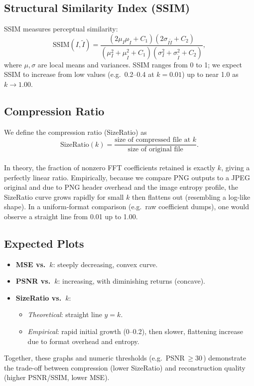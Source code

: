 \documentclass[12pt]{article}
\begin{document}
\subsection{Structural Similarity Index (SSIM)}
SSIM measures perceptual similarity:
\[
\mathrm{SSIM}(I,\tilde I)
=\frac{(2\mu_I\mu_{\tilde I}+C_1)(2\sigma_{I\tilde I}+C_2)}
{(\mu_I^2+\mu_{\tilde I}^2 + C_1)(\sigma_I^2+\sigma_{\tilde I}^2 + C_2)},
\]
\noindent where \(\mu,\sigma\) are local means and variances.  SSIM ranges from 0 to 1; we expect SSIM to increase from low values (e.g.\ 0.2–0.4 at \(k=0.01\)) up to near 1.0 as \(k\to1.00\).

\subsection{Compression Ratio}
We define the compression ratio (SizeRatio) as
\[
\mathrm{SizeRatio}(k)
=\frac{\text{size of compressed file at }k}{\text{size of original file}}.
\]
\\
\noindent In theory, the fraction of nonzero FFT coefficients retained is exactly \(k\), giving a perfectly linear ratio.  Empirically, because we compare PNG outputs to a JPEG original and due to PNG header overhead and the image entropy profile, the SizeRatio curve grows rapidly for small \(k\) then flattens out (resembling a log-like shape).  In a uniform‐format comparison (e.g.\ raw coefficient dumps), one would observe a straight line from 0.01 up to 1.00.

\subsection{Expected Plots}
\begin{itemize}
  \item \textbf{MSE vs.\ \(k\)}: steeply decreasing, convex curve.  
  \item \textbf{PSNR vs.\ \(k\)}: increasing, with diminishing returns (concave).  
  \item \textbf{SizeRatio vs.\ \(k\)}:  
    \begin{itemize}
      \item \emph{Theoretical}: straight line \(y=k\).  
      \item \emph{Empirical}: rapid initial growth (0–0.2), then slower, flattening increase due to format overhead and entropy.
    \end{itemize}
\end{itemize}
\noindent Together, these graphs and numeric thresholds (e.g.\ PSNR\,\(\ge 30\)\,) demonstrate the trade-off between compression (lower SizeRatio) and reconstruction quality (higher PSNR/SSIM, lower MSE).
\end{document}
